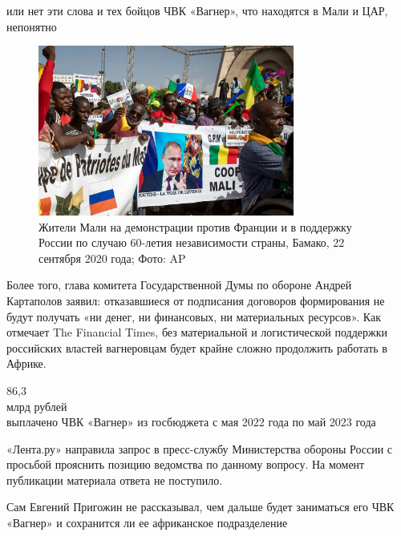 \begin{center}
    \Large
     или нет эти слова и тех бойцов ЧВК «Вагнер», что находятся в Мали и ЦАР, непонятно
\end{center}


\begin{figure}[h]
    \centering
    \includegraphics[width=0.75\textwidth]{img/pmc_africa_2.jpg}
    \caption{Жители Мали на демонстрации против Франции и в поддержку России по случаю 60-летия независимости страны, Бамако, 22 сентября 2020 года; Фото: AP }
\end{figure}

Более того, глава комитета Государственной Думы по обороне Андрей Картаполов заявил: отказавшиеся от подписания договоров формирования не будут получать «ни денег, ни финансовых, ни материальных ресурсов». Как отмечает The Financial Times, без материальной и логистической поддержки российских властей вагнеровцам будет крайне сложно продолжить работать в Африке.

\begin{center}
    {\Huge 86,3}\\
    {\huge млрд рублей}\\[1em]

    {\Large выплачено ЧВК «Вагнер» из госбюджета с мая 2022 года по май 2023 года }
\end{center}

«Лента.ру» направила запрос в пресс-службу Министерства обороны России с просьбой прояснить позицию ведомства по данному вопросу. На момент публикации материала ответа не поступило.

\begin{center}
    \Large Сам Евгений Пригожин не рассказывал, чем дальше будет заниматься его ЧВК «Вагнер» и сохранится ли ее африканское подразделение
\end{center}


